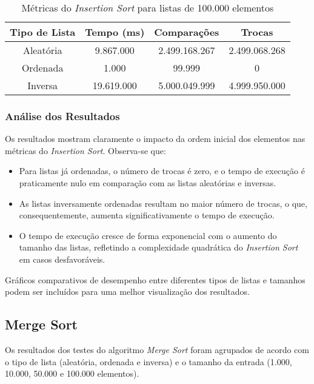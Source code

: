 \documentclass[a4paper,12pt]{article}
\begin{document}
\begin{table}[H] 
    \centering 
    \caption{Métricas do \textit{Insertion Sort} para listas de 100.000 elementos} 
    \begin{tabular}{|c|c|c|c|} 
        \hline 
        \textbf{Tipo de Lista} & \textbf{Tempo (ms)} & \textbf{Comparações} & \textbf{Trocas} \\ 
        \hline 
        Aleatória & 9.867.000 & 2.499.168.267 & 2.499.068.268 \\ 
        \hline 
        Ordenada & 1.000 & 99.999 & 0 \\ 
        \hline 
        Inversa & 19.619.000 & 5.000.049.999 & 4.999.950.000 \\ 
        \hline 
    \end{tabular} 
\end{table}


\subsubsection{Análise dos Resultados}

Os resultados mostram claramente o impacto da ordem inicial dos elementos nas métricas do \textit{Insertion Sort}. Observa-se que: \begin{itemize} \item Para listas já ordenadas, o número de trocas é zero, e o tempo de execução é praticamente nulo em comparação com as listas aleatórias e inversas. \item As listas inversamente ordenadas resultam no maior número de trocas, o que, consequentemente, aumenta significativamente o tempo de execução. \item O tempo de execução cresce de forma exponencial com o aumento do tamanho das listas, refletindo a complexidade quadrática do \textit{Insertion Sort} em casos desfavoráveis. \end{itemize}

Gráficos comparativos de desempenho entre diferentes tipos de listas e tamanhos podem ser incluídos para uma melhor visualização dos resultados.


\subsection{Merge Sort}

Os resultados dos testes do algoritmo \textit{Merge Sort} foram agrupados de acordo com o tipo de lista (aleatória, ordenada e inversa) e o tamanho da entrada (1.000, 10.000, 50.000 e 100.000 elementos).
\end{document}
